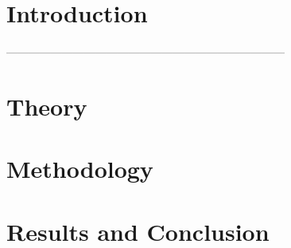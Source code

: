 
\addtolength{\evensidemargin}{-12mm}

%
%
\part[Introduction]{Introduction}
\label{part:intro}



---------------------------------------------------------------------------
%
%
\part[Theory]{Theory}
\label{part:BackgroundTheory}


%

\part[Methodology]{Methodology}
\label{part:body}









\part[Results and Conclusion]{Results and Conclusion}
\label{part:resultsAndConclusion}






%
%


